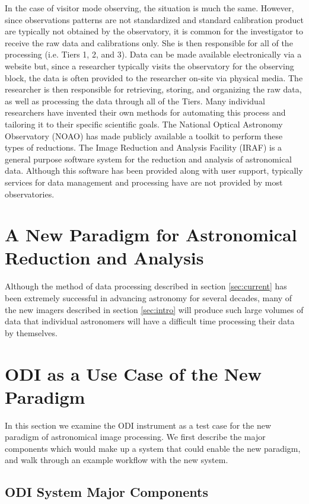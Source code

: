 \documentclass[10pt,conference]{IEEEtran}
\begin{document}
In the case of visitor mode observing, the situation is much the same. However, since observations patterns are not standardized and standard calibration product are typically not obtained by the observatory, it is common for the investigator to receive the raw data and calibrations only. She is then responsible for all of the processing (i.e. Tiers 1, 2, and 3). Data can be made available electronically via a website but, since a researcher typically visits the observatory for the observing block, the data is often provided to the researcher on-site via physical media. The researcher is then responsible for retrieving, storing, and organizing the raw data, as well as processing the data through all of the Tiers. Many individual researchers have invented their own methods for automating this process and tailoring it to their specific scientific goals. The National Optical Astronomy Observatory (NOAO) has made publicly available a toolkit to perform these types of reductions. The Image Reduction and Analysis Facility (IRAF) is a general purpose software system for the reduction and analysis of astronomical data. Although this software has been provided along with user support, typically services for data management and processing have are not provided by most observatories. 

\section{A New Paradigm for Astronomical Reduction and Analysis}\label{sec:rev}

Although the method of data processing described in section \ref{sec:current} has been extremely successful in advancing astronomy for several decades, many of the new imagers described in section \ref{sec:intro} will produce such large volumes of data that individual astronomers will have a difficult time processing their data by themselves. 

\section{ODI as a Use Case of the New Paradigm}\label{sec:ODI}

In this section we examine the ODI instrument as a test case for the new paradigm of astronomical image processing. We first describe the major components which would make up a system that could enable the new paradigm, and walk through an example workflow with the new system. 

\subsection{ODI System Major Components}\label{sec:components}
\end{document}

